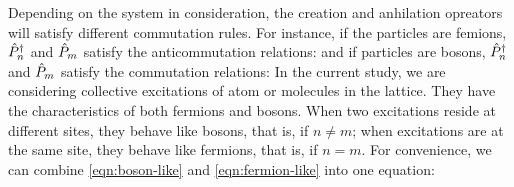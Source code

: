 Depending on the system in consideration, the creation and anhilation opreators will satisfy different commutation
rules. For instance, if the particles are femions, $\hat{P}^{\dagger}_{n}$ and $\hat{P}_{m}$ satisfy the anticommutation relations:
and if particles are bosons, $\hat{P}^{\dagger}_{n}$ and $\hat{P}_{m}$ satisfy the commutation relations:
In the current study, we are considering collective excitations of atom or molecules in the lattice. They have the 
characteristics of both fermions and bosons. When two excitations reside at different sites, they behave like
bosons, that is,
if $n \neq m$; when excitations are at the same site, they behave like fermions, that is,
if $n = m$. For convenience, we can combine \autoref{eqn:boson-like} and \autoref{eqn:fermion-like} into one equation:

